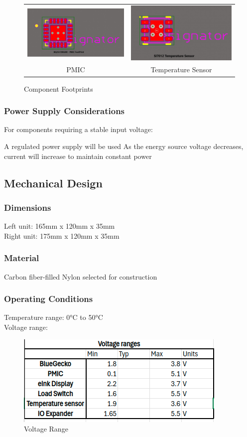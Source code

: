 \documentclass[a4paper,11pt]{article}%
\begin{document}
\begin{figure}[H]
\begin{tabular}{cc}
        \includegraphics[width=0.40\linewidth]{figures/PMIC.jpg} &
        \includegraphics[width=0.40\linewidth]{figures/Temperature sensor.jpg} \\
        PMIC & Temperature Sensor
    \end{tabular}
    \caption{Component Footprints}
    \label{fig:component_footprints}
\end{figure}

\subsubsection{Power Supply Considerations}
For components requiring a stable input voltage:

A regulated power supply will be used
As the energy source voltage decreases, current will increase to maintain constant power

\subsection{Mechanical Design}
\subsubsection{Dimensions}

Left unit: 165mm x 120mm x 35mm\\
Right unit: 175mm x 120mm x 35mm

\subsubsection{Material}
Carbon fiber-filled Nylon selected for construction
\subsubsection{Operating Conditions}

Temperature range: 0°C to 50°C\\
Voltage range: 
\begin{figure}[H]
	\centering
	\includegraphics[scale=0.6]{figures/vr}
	\caption{Voltage Range}
\end{figure}
\end{document}
